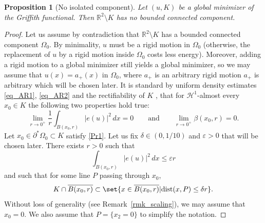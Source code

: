 \documentclass[12pt]{article}
\newtheorem{proposition}[theorem]{Proposition}
\theoremstyle{definition}
\theoremstyle{remark}
\numberwithin{equation}{section}
\newcommand{\dd}{\partial}
\newcommand{\R}{\mathbb{R}}
\renewcommand{\H}{\mathcal{H}}
\begin{document}

\begin{proposition}[No isolated component]\label{noiso}
    Let $(u,K)$ be a global minimizer of the Griffith functional. Then $\R^2\setminus K$ has no bounded connected component.
\end{proposition}

\begin{proof}
    Let us assume by contradiction that $\R^2\setminus K$ has a bounded connected component $\Omega_0$. By minimality, $u$
    must be a rigid motion in $\Omega_0$ (otherwise, the replacement of $u$ by a rigid motion inside $\Omega_0$ costs less energy).  Moreover, adding a rigid motion to a global minimizer still yields a global minimizer, so we may
    assume that $u(x)=a_+(x)$ in $\Omega_0$, where $a_+$ is an arbitrary rigid motion $a_+$ is arbitrary which will be chosen later.  It
    is standard by uniform density estimates \eqref{eq_AR1}, \eqref{eq_AR2} and the rectifiability of $K$
    \cite{camilleUR}, that for $\H^1$-almost every $x_0\in K$ the following two properties hold true: 
    \begin{equation}\label{Pr1}
        \lim_{r\to 0^+}\frac{1}{r}\int_{B(x_0,r)}|e(u)|^2\,dx=0
        \qquad\text{and}\qquad
        \lim_{r\to 0^+} \beta(x_0,r)=0.
    \end{equation}
    Let $x_0\in\dd^*\Omega_0\subset K$ satisfy \eqref{Pr1}. Let us fix $\delta\in(0,1/10)$ and $\varepsilon>0$ that
    will be chosen later. There exists $r>0$ such that 
    \begin{equation}
        \label{eqeq25}
        \int_{B(x_0,r)}|e(u)|^2\,dx\leq \varepsilon r
    \end{equation}
    and such that for some line $P$ passing through $x_0$,
    \begin{equation}
        K \cap \overline{B(x_0,r)} \subset \set{x \in \overline{B(x_0,r)} | \mathrm{dist}(x,P) \leq \delta r}. 
    \end{equation}
    Without loss of generality (see Remark~\ref{rmk_scaling}), we may assume that $x_0 = 0$.
    We also assume that $P = \{x_2 = 0\}$ to simplify the notation. %




\end{proof}
\end{document}
